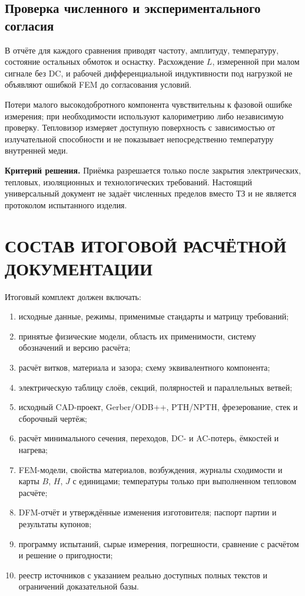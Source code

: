 \documentclass[14pt,a4paper]{extarticle}
\newcommand{\criterion}{\par\noindent\textbf{Критерий решения.} }
\begin{document}
\subsection{Проверка численного и экспериментального согласия}
В отчёте для каждого сравнения приводят частоту, амплитуду, температуру, состояние остальных обмоток и оснастку. Расхождение $L$, измеренной при малом сигнале без DC, и рабочей дифференциальной индуктивности под нагрузкой не объявляют ошибкой FEM до согласования условий.

Потери малого высокодобротного компонента чувствительны к фазовой ошибке измерения; при необходимости используют калориметрию либо независимую проверку. Тепловизор измеряет доступную поверхность с зависимостью от излучательной способности и не показывает непосредственно температуру внутренней меди.

\criterion Приёмка разрешается только после закрытия электрических, тепловых, изоляционных и технологических требований. Настоящий универсальный документ не задаёт численных пределов вместо ТЗ и не является протоколом испытанного изделия.

\section{СОСТАВ ИТОГОВОЙ РАСЧЁТНОЙ ДОКУМЕНТАЦИИ}
\label{pl:docs}
Итоговый комплект должен включать:
\begin{enumerate}
\item исходные данные, режимы, применимые стандарты и матрицу требований;
\item принятые физические модели, область их применимости, систему обозначений и версию расчёта;
\item расчёт витков, материала и зазора; схему эквивалентного компонента;
\item электрическую таблицу слоёв, секций, полярностей и параллельных ветвей;
\item исходный CAD-проект, Gerber/ODB++, PTH/NPTH, фрезерование, стек и сборочный чертёж;
\item расчёт минимального сечения, переходов, DC- и AC-потерь, ёмкостей и нагрева;
\item FEM-модели, свойства материалов, возбуждения, журналы сходимости и карты $B$, $H$, $J$ с единицами; температуры только при выполненном тепловом расчёте;
\item DFM-отчёт и утверждённые изменения изготовителя; паспорт партии и результаты купонов;
\item программу испытаний, сырые измерения, погрешности, сравнение с расчётом и решение о пригодности;
\item реестр источников с указанием реально доступных полных текстов и ограничений доказательной базы.
\end{enumerate}
\end{document}
